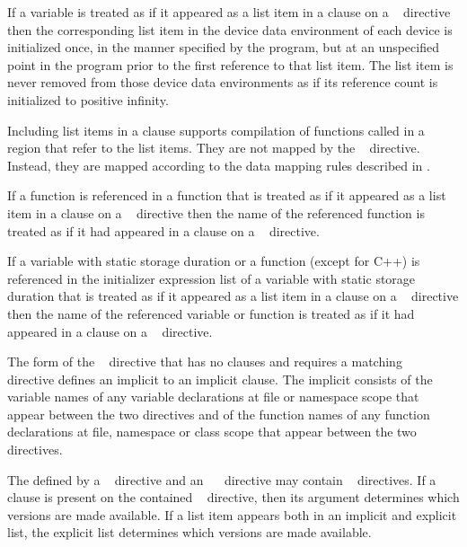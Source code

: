 If a variable is treated as if it appeared as a list item in a 
clause on a ~ directive then the corresponding list
item in the device data environment of each device is initialized once, in the
manner specified by the program, but at an unspecified point in the program
prior to the first reference to that list item.  The list item is never removed
from those device data environments as if its reference count is initialized to
positive infinity.

Including list items in a  clause supports compilation of
functions called in a  region that refer to the list
items.  They are not mapped by the ~
directive.  Instead, they are mapped according to the data mapping
rules described in .

\begin{ccppspecific}
If a function is referenced in a function that is treated as if it appeared as
a list item in a  clause on a ~ directive
then the name of the referenced function is treated as if it had appeared in a
 clause on a ~ directive.

If a variable with static storage duration or a function (except
 for C++) is referenced in the
initializer expression list of a variable with static storage duration that is
treated as if it appeared as a list item in a  clause on a
~ directive then the name of the referenced variable
or function is treated as if it had appeared in a  clause on a
~ directive.

The form of the ~ directive that has no clauses
and requires a matching ~~ directive
defines an implicit  to an implicit 
clause. The implicit  consists of the variable names
of any variable declarations at file or namespace scope that appear between
the two directives and of the function names of any function declarations at
file, namespace or class scope that appear between the two directives.

The  defined by a
~ directive and an
~~ directive may contain
~ directives. If a  clause
is present on the contained ~ directive, then its
argument determines which versions are made available.
If a list item appears both in an implicit and explicit list, the explicit
list determines which versions are made available.

\end{ccppspecific}


